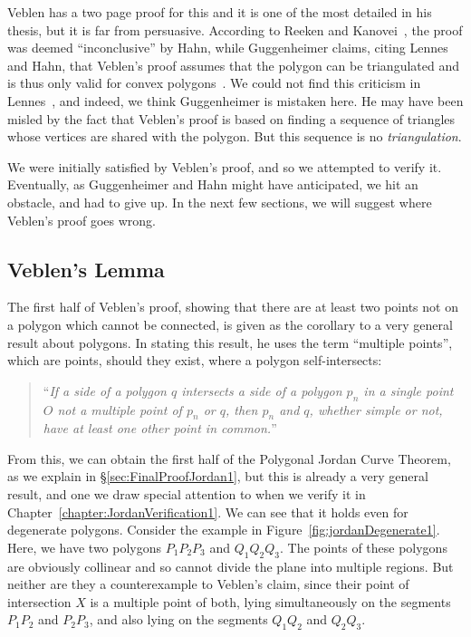 Veblen has a two page proof for this and it is one of the most detailed in his thesis, but it is far from persuasive. According to Reeken and Kanovei~\cite{HahnInconclusiveIndirect}, the proof was deemed ``inconclusive'' by Hahn, while Guggenheimer claims, citing Lennes and Hahn, that Veblen's proof assumes that the polygon can be triangulated and is thus only valid for convex polygons~\cite{GuggenheimerJordanCurve}. We could not find this criticism in Lennes~\cite{LennesPolygon}, and indeed, we think Guggenheimer is mistaken here. He may have been misled by the fact that Veblen's proof is based on finding a sequence of triangles whose vertices are shared with the polygon. But this sequence is no \emph{triangulation}. 

We were initially satisfied by Veblen's proof, and so we attempted to verify it. Eventually, as Guggenheimer and Hahn might have anticipated, we hit an obstacle, and had to give up. In the next few sections, we will suggest where Veblen's proof goes wrong.

\subsection{Veblen's Lemma}\label{sec:VeblenLemma1}
The first half of Veblen's proof, showing that there are at least two points not on a polygon which cannot be connected, is given as the corollary to a very general result about polygons. In stating this result, he uses the term ``multiple points'', which are points, should they exist, where a polygon self-intersects:
\begin{quote}
``\emph{If a side of a polygon $q$ intersects a side of a polygon $p_n$ in a single point $O$ not a multiple point of $p_n$ or $q$, then $p_n$ and $q$, whether simple or not, have at least one other point in common.}''
\end{quote}

From this, we can obtain the first half of the Polygonal Jordan Curve Theorem, as we explain in \S\ref{sec:FinalProofJordan1}, but this is already a very general result, and one we draw special attention to when we verify it in Chapter~\ref{chapter:JordanVerification1}. We can see that it holds even for  degenerate polygons. Consider the example in Figure~\ref{fig:jordanDegenerate1}. Here, we have two polygons $P_1P_2P_3$ and $Q_1Q_2Q_3$. The points of these polygons are obviously collinear and so cannot divide the plane into multiple regions. But neither are they a counterexample to Veblen's claim, since their point of intersection $X$ is a multiple point of both, lying simultaneously on the segments $P_1P_2$ and $P_2P_3$, and also lying on the segments $Q_1Q_2$ and $Q_2Q_3$.

